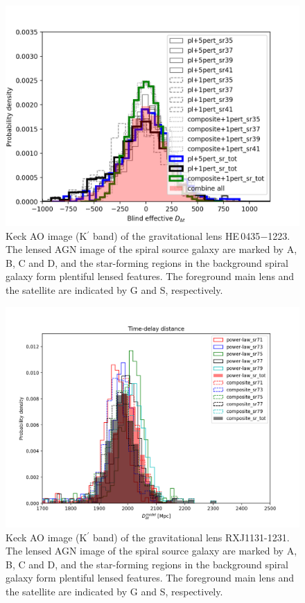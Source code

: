 \documentclass[useAMS,usenatbib]{mnras}
\newcommand\he{HE\,0435$-$1223}
\begin{document}
\begin{figure}
\centering
\includegraphics[scale=1.0]{HE0435_systematics_tests4.png}
\caption{Keck AO image (K$^\prime$ band) of the gravitational lens \he. The lensed AGN image  of the spiral source galaxy are marked by A, B, C and D, and the star-forming regions in the background spiral galaxy form plentiful lensed features. The foreground main lens and the satellite are indicated by G and S, respectively.}
\label{fig:HE0435_Ddt}
\end{figure}

\begin{figure}
\centering
\includegraphics[scale=0.8]{RXJ1131_Ddt.png}
\caption{Keck AO image (K$^\prime$ band) of the gravitational lens RXJ1131-1231. The lensed AGN image  of the spiral source galaxy are marked by A, B, C and D, and the star-forming regions in the background spiral galaxy form plentiful lensed features. The foreground main lens and the satellite are indicated by G and S, respectively.}
\label{fig:RXJ1131_Ddt}
\end{figure}
\end{document}
